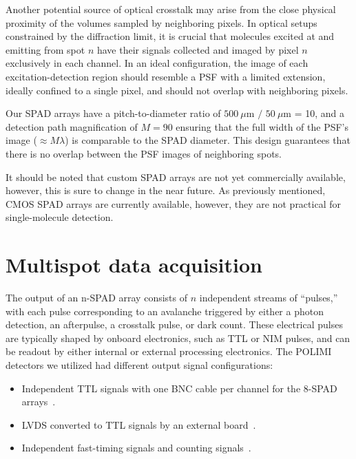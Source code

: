 Another potential source of optical crosstalk may arise from the close physical proximity of the volumes sampled by neighboring pixels. 
In optical setups constrained by the diffraction limit, it is crucial that molecules excited at and emitting from spot $n$ have their signals collected and imaged by pixel $n$ exclusively in each channel. 
In an ideal configuration, the image of each excitation-detection region should resemble a \ac{PSF} with a limited extension, ideally confined to a single pixel, and should not overlap with neighboring pixels.

Our \ac{SPAD} arrays have a pitch-to-diameter ratio of $500~\mu$m $/$ $50~\mu$m = 10, and a detection path magnification of $M = 90$ ensuring that the full width of the \ac{PSF}'s image ($\approx M\lambda$) is comparable to the \ac{SPAD} diameter. 
This design guarantees that there is no overlap between the \ac{PSF} images of neighboring spots.

It should be noted that custom \ac{SPAD} arrays are not yet commercially available, however, this is sure to change in the near future. 
As previously mentioned, \ac{CMOS} \ac{SPAD} arrays are currently available, however, they are not practical for single-molecule detection.

\section{Multispot data acquisition}
\label{sec:data_acquisition}

The output of an n-\ac{SPAD} array consists of $n$ independent streams of \enquote{pulses,} with each pulse corresponding to an avalanche triggered by either a photon detection, an afterpulse, a crosstalk pulse, or dark count. 
These electrical pulses are typically shaped by onboard electronics, such as \ac{TTL} or \ac{NIM} pulses, and can be readout by either internal or external processing electronics. 
The \ac{POLIMI} detectors we utilized had different output signal configurations:

\begin{itemize}
\item Independent TTL signals with one \ac{BNC}
cable per channel for the 8-\ac{SPAD} arrays~\cite{colyer_BOE_2010,ingargiola_SPIE_2013,ingargiola_PLOS1_2016}.
\item \ac{LVDS} converted to \ac{TTL} signals by an external board~\cite{ingargiola_JCP_2018}.
\item Independent fast-timing signals and counting signals~\cite{ingargiola_SPIE_2017}.
\end{itemize}

